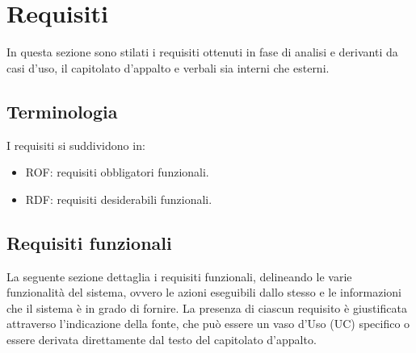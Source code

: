 \documentclass[12pt, oneside]{article}
\begin{document}








\newpage











%
%

%

%

\section{Requisiti}
In questa sezione sono stilati i requisiti ottenuti in fase di analisi e derivanti da casi d'uso, il capitolato d'appalto e verbali sia interni che esterni. 
\subsection{Terminologia}
I requisiti si suddividono in:
\begin{itemize}
    \item ROF: requisiti obbligatori funzionali.
    \item RDF: requisiti desiderabili funzionali.
\end{itemize}
\subsection{Requisiti funzionali}
La seguente sezione dettaglia i requisiti funzionali, delineando le varie funzionalità del sistema, ovvero le azioni eseguibili dallo stesso e le informazioni che il sistema è in grado di fornire. La presenza di ciascun requisito è giustificata attraverso l'indicazione della fonte, che può essere un vaso d'Uso (UC) specifico o essere derivata direttamente dal testo del capitolato d'appalto.
\end{document}
